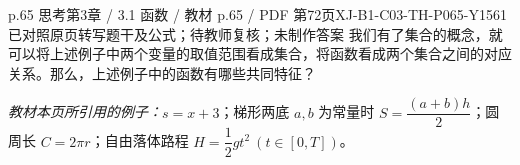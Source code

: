 \par\noindent\begin{minipage}{\linewidth}
\begin{bankitem}{p.65 思考}{第3章 / 3.1 函数 / 教材 p.65 / PDF 第72页}{XJ-B1-C03-TH-P065-Y1561}{已对照原页转写题干及公式；待教师复核；未制作答案}
我们有了集合的概念，就可以将上述例子中两个变量的取值范围看成集合，将函数看成两个集合之间的对应关系。那么，上述例子中的函数有哪些共同特征？
\par\textit{教材本页所引用的例子：}$s=x+3$；梯形两底 $a,b$ 为常量时 $S=\dfrac{(a+b)h}2$；圆周长 $C=2\pi r$；自由落体路程 $H=\dfrac12gt^2\ (t\in[0,T])$。
\end{bankitem}
\end{minipage}\par\medskip
